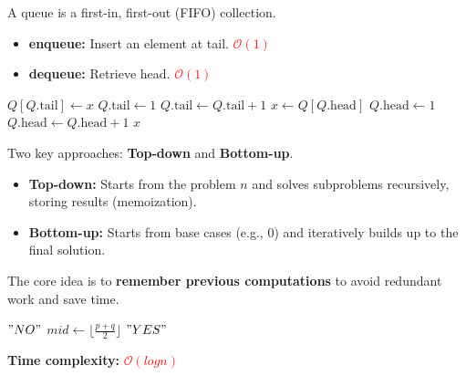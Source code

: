 \documentclass[a4paper,landscape]{article}
\newcommand{\timecomplexity}[1]{\textcolor{red}{#1}}
\newcommand{\bigo}{\mathcal{O}}
\begin{document}
\begin{multicols}{7}
\endtcolorbox
\tcolorbox[mybox={Queue}]
A queue is a first-in, first-out (FIFO) collection.
\begin{itemize}[noitemsep,itemsep=0pt]
    \item \textbf{enqueue:} Insert an element at tail. \timecomplexity{\(\bigo(1)\)}
    \item \textbf{dequeue:} Retrieve head. \timecomplexity{\(\bigo(1)\)}
\end{itemize}
\begin{algorithmic}[1]
        \State $Q[Q.\text{tail}] \gets x$
            \State $Q.\text{tail} \gets 1$
        \Else
            \State $Q.\text{tail} \gets Q.\text{tail} + 1$
        \EndIf
    \EndProcedure
    \State
        \State $x \gets Q[Q.\text{head}]$
            \State $Q.\text{head} \gets 1$
        \Else
            \State $Q.\text{head} \gets Q.\text{head} + 1$
        \EndIf
        \State \Return $x$
    \EndProcedure
\end{algorithmic}
\endtcolorbox

\tcolorbox[mybox={Dynamic Programming}]
Two key approaches: \textbf{Top-down} and \textbf{Bottom-up}.
\begin{itemize}[noitemsep, itemsep=0pt]
    \item \textbf{Top-down:} Starts from the problem $n$ and solves subproblems recursively, storing results (memoization).
    \item \textbf{Bottom-up:} Starts from base cases (e.g., 0) and iteratively builds up to the final solution.
\end{itemize}
The core idea is to \textbf{remember previous computations} to avoid redundant work and save time.
\endtcolorbox

\tcolorbox[mybox={Binary search}]
\begin{algorithmic}[1]
            \State \Return $"NO"$ 
        \Else
            \State $mid \gets \lfloor \frac{p+q}{2} \rfloor$
                \State \Return $"YES"$
                \State \Return {}
            \Else
                \State \Return {}
            \EndIf
        \EndIf
    \EndProcedure
\end{algorithmic}
\textbf{Time complexity:} \timecomplexity{$\bigo(logn)$}
\endtcolorbox


\end{multicols}
\end{document}
